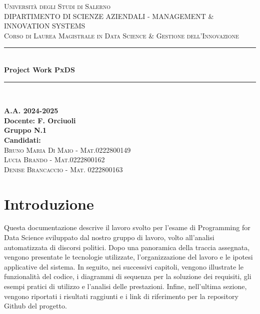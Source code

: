 \documentclass[12pt]{article}
\newcommand{\HRule}{\rule{\linewidth}{0.5mm}}
\begin{document}
	
	\begin{titlepage}
	\thispagestyle{fancy} %
	\fancyhf{} %
		\begin{center}
			
			\textsc{\LARGE Università degli Studi di Salerno}\\[1.5cm]
			\textsc{\large DIPARTIMENTO DI SCIENZE AZIENDALI - MANAGEMENT \& INNOVATION SYSTEMS}\\[0.2cm]
			\textsc{\large Corso di Laurea Magistrale in Data Science \& Gestione dell'Innovazione}\\[0.2cm]
			
			\HRule \\[0.3cm]
			{ \huge \bfseries Project Work PxDS}\\[0.4cm]
			\HRule \\[1.5cm]
			
			\begin{center}
				\textbf{A.A. 2024-2025} \\
				\textbf{Docente: F. Orciuoli} \\[1.5cm]
				\textbf{Gruppo N.1}\\
				\textbf{\bfseries Candidati:\\}
				\textsc{Bruno Maria Di Maio - Mat.0222800149}\\
				\textsc{Lucia Brando - Mat.0222800162}\\
				\textsc{Denise Brancaccio - Mat. 0222800163}
			\end{center}
			
		\end{center}
	\end{titlepage}
\newpage

	\tableofcontents

\newpage

	\section{Introduzione}
Questa documentazione descrive il lavoro svolto per l'esame di Programming for Data Science sviluppato dal nostro gruppo di lavoro, volto all'analisi automatizzata di discorsi politici. Dopo una panoramica della traccia assegnata, vengono presentate le tecnologie utilizzate, l'organizzazione del lavoro e le ipotesi applicative del sistema. In seguito, nei successivi capitoli, vengono illustrate le funzionalità del codice, i diagrammi di sequenza per la soluzione dei requisiti, gli esempi pratici di utilizzo e l'analisi delle prestazioni. Infine, nell'ultima sezione, vengono riportati i risultati raggiunti e i link di riferimento per la repository Github del progetto.
\end{document}
